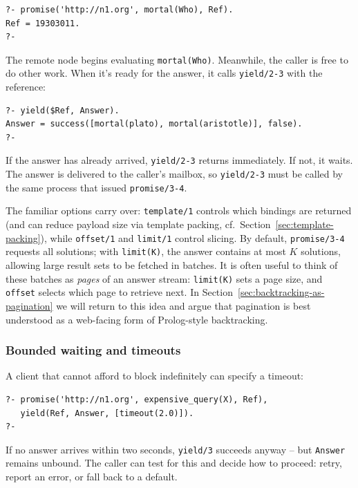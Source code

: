 \begin{verbatim}
?- promise('http://n1.org', mortal(Who), Ref).
Ref = 19303011.
?-
\end{verbatim}

\noindent The remote node begins evaluating \texttt{mortal(Who)}. Meanwhile, the caller is free to do other work. When it's ready for the answer, it calls \texttt{yield/2-3} with the reference:

\begin{verbatim}
?- yield($Ref, Answer).
Answer = success([mortal(plato), mortal(aristotle)], false).
?-
\end{verbatim}

\noindent If the answer has already arrived, \texttt{yield/2-3} returns immediately. If not, it waits. The answer is delivered to the caller's mailbox, so \texttt{yield/2-3} must be called by the same process that issued \texttt{promise/3-4}.

The familiar options carry over: \texttt{template/1} controls which bindings are returned (and can reduce payload size via template packing, cf.\ Section~\ref{sec:template-packing}), while \texttt{offset/1} and \texttt{limit/1} control slicing. By default, \texttt{promise/3-4} requests all solutions; with \texttt{limit(K)}, the answer contains at most $K$ solutions, allowing large result sets to be fetched in batches. It is often useful to think of these batches as \emph{pages} of an answer stream: \texttt{limit(K)} sets a page size, and \texttt{offset} selects which page to retrieve next. In Section~\ref{sec:backtracking-as-pagination} we will return to this idea and argue that pagination is best understood as a web-facing form of Prolog-style backtracking.

\subsubsection{Bounded waiting and timeouts}
\label{sec:bounded-waiting}

A client that cannot afford to block indefinitely can specify a timeout:

\begin{verbatim}
?- promise('http://n1.org', expensive_query(X), Ref),
   yield(Ref, Answer, [timeout(2.0)]).
?-
\end{verbatim}

\noindent If no answer arrives within two seconds, \texttt{yield/3} succeeds anyway -- but \texttt{Answer} remains unbound. The caller can test for this and decide how to proceed: retry, report an error, or fall back to a default.

